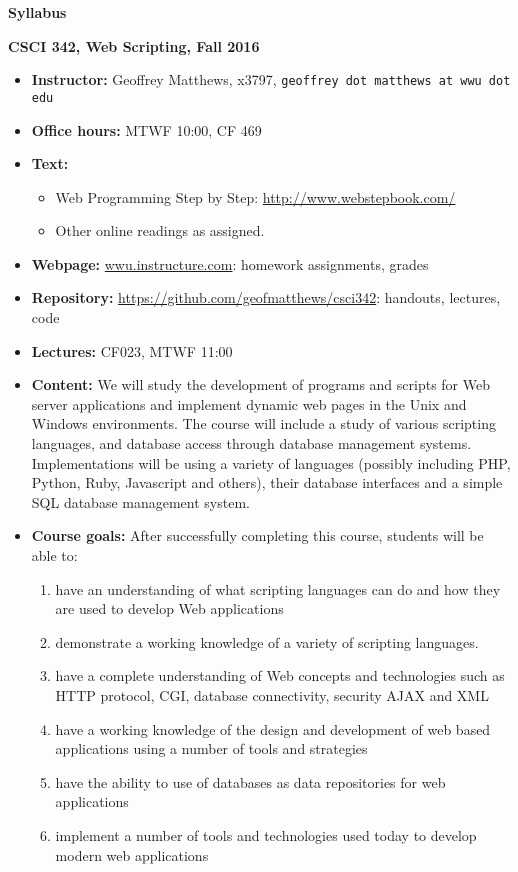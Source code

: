 \documentclass{article}
\begin{document}
\centerline{\large \bf Syllabus}

\centerline{\bf CSCI 342, Web Scripting, Fall 2016}

\begin{itemize}

\item
{\bf Instructor:} Geoffrey Matthews, x3797, {\tt  geoffrey dot matthews at wwu dot edu}
\item
{\bf Office hours:} MTWF 10:00, CF 469
\item
{\bf Text:} \begin{itemize}\item
Web Programming Step by Step: \url{http://www.webstepbook.com/}
\item
Other online readings as assigned.
\end{itemize}
\item {\bf Webpage:}  \url{wwu.instructure.com}:  homework assignments, grades
\item {\bf Repository:} \url{https://github.com/geofmatthews/csci342}:  handouts, lectures, code
\item
{\bf Lectures:} 
CF023, MTWF 11:00

\item
{\bf Content:} We will study the development of programs and scripts
for Web server applications and implement dynamic web pages in the
Unix and Windows environments.  The course will include a study of
various scripting languages, and database access through database
management systems.  Implementations will be using a variety of
languages (possibly including PHP, Python, Ruby, Javascript and
others), their database interfaces and a simple SQL database
management system.

\item {\bf Course goals:}  After successfully completing this course,
  students will be able to:
  \begin{enumerate}
    \item have an understanding of what scripting languages can do and
      how they are used to develop Web applications
    \item
      demonstrate a
      working knowledge of a variety of scripting languages.
    \item
      have a complete understanding of
      Web concepts and technologies such as HTTP protocol, CGI,
      database connectivity, security AJAX and XML
    \item have a working
      knowledge of the design and development of web based
      applications using a number of tools and strategies
    \item have the
      ability to use of databases as data repositories for web
      applications
    \item implement a number of tools and technologies
      used today to develop modern web applications
  \end{enumerate}
  


\end{itemize}
\end{document}
